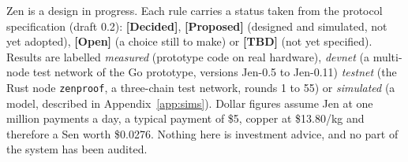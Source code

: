 \documentclass[11pt,a4paper]{article}
\newcommand{\st}[1]{\textsf{\footnotesize\textbf{[#1]}}}
\begin{document}
\tableofcontents
\vspace{0.6cm}
\begin{keybox}
\small
Zen is a design in progress. Each rule carries a status taken from the protocol specification (draft 0.2): \st{Decided}, \st{Proposed} (designed and simulated, not yet adopted), \st{Open} (a choice still to make) or \st{TBD} (not yet specified). Results are labelled \emph{measured} (prototype code on real hardware), \emph{devnet} (a multi-node test network of the Go prototype, versions Jen-0.5 to Jen-0.11) \emph{testnet} (the Rust node \texttt{zenproof}, a three-chain test network, rounds 1 to 55) or \emph{simulated} (a model, described in Appendix~\ref{app:sims}). Dollar figures assume Jen at one million payments a day, a typical payment of \$5, copper at \$13.80/kg and therefore a Sen worth \$0.0276. Nothing here is investment advice, and no part of the system has been audited.
\end{keybox}
\newpage





\end{document}
